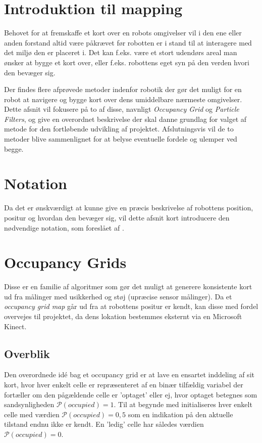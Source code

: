 \section{Introduktion til mapping}
Behovet for at fremskaffe et kort over en robots omgivelser vil i den ene eller anden forstand altid være påkrævet før robotten er i stand til at interagere med det miljø den er placeret i.
Det kan f.eks. være et stort udendørs areal man ønsker at bygge et kort over, eller f.eks. robottens eget syn på den verden hvori den bevæger sig.

Der findes flere afprøvede metoder indenfor robotik der gør det muligt for en robot at navigere og bygge kort over dens umiddelbare nærmeste omgivelser.
Dette afsnit vil fokusere på to af disse, navnligt \textit{Occupancy Grid} og \textit{Particle Filters}, og give en overordnet beskrivelse der skal danne grundlag for valget af metode for den fortløbende udvikling af projektet.
Afslutningsvis vil de to metoder blive sammenlignet for at belyse eventuelle fordele og ulemper ved begge.

\section{Notation}
Da det er ønskværdigt at kunne give en præcis beskrivelse af robottens position, positur og hvordan den bevæger sig, vil dette afsnit kort introducere den nødvendige notation, som foreslået af \citet{probabilisticRobotics}.


\section{Occupancy Grids}
Disse er en familie af algoritmer som gør det muligt at generere konsistente kort ud fra målinger med usikkerhed og støj (upræcise sensor målinger).
Da et \textit{occupancy grid map} går ud fra at robottens positur er kendt, kan disse med fordel overvejes til projektet, da dens lokation bestemmes eksternt via en Microsoft Kinect. \cite{probabilisticRobotics}

\subsection{Overblik}
Den overordnede idé bag et occupancy grid er at lave en ensartet inddeling af sit kort, hvor hver enkelt celle er repræsenteret af en binær tilfældig variabel der fortæller om den pågældende celle er 'optaget' eller ej, hvor optaget betegnes som sandsynligheden $\mathcal{P}(occupied) = 1$.
Til at begynde med initialiseres hver enkelt celle med værdien $\mathcal{P}(occupied) = 0,5$ som en indikation på den aktuelle tilstand endnu ikke er kendt.
En 'ledig' celle har således værdien $\mathcal{P}(occupied) = 0$.

